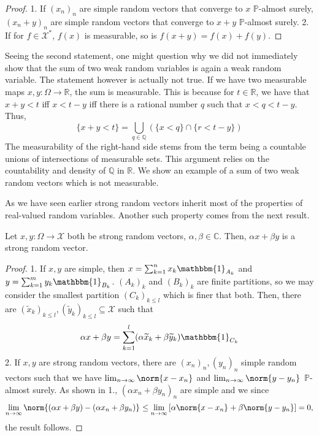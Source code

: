 \begin{proof}
    1. If \( (x_n)_n \) are simple random vectors that converge to \( x \) \( \mathbb{P} \)-almost surely, \( (x_n+y)_n \) are simple random vectors that converge to \( x+y \) \( \mathbb{P} \)-almost surely.
    2. If for \( f \in \mathcal{X}^{*} \), \( f(x) \) is measurable, so is \( f(x+y)=f(x)+f(y) \).
\end{proof}


Seeing the second statement, one might question why we did not immediately show that the sum of two weak random variables is again a weak random variable. The statement however is actually not true. If we have two measurable maps \( x,y: \Omega \to \mathbb{R} \), the sum is measurable. This is because for \( t \in \mathbb{R} \), we have that \( x+y < t \) iff \( x < t-y \) iff there is a rational number \( q \) such that \( x<q< t-y \). Thus,
\[ \{x+y< t\} = \bigcup_{q \in \mathbb{Q}} \left(\{x<q\} \cap \{r<t-y\}\right)\]
The measurability of the right-hand side stems from the term being a countable unions of intersections of measurable sets. This argument  relies on the countability and density of \( \mathbb{Q} \) in \( \mathbb{R} \). 
We show an example of a sum of two weak random vectors which is not measurable.

\begin{exm}
    
\end{exm}

As we have seen earlier strong random vectors inherit most of the properties of real-valued random variables. Another such property comes from the next result.
\begin{lem}
    Let \( x,y: \Omega \to \mathcal{X} \) both be strong random vectors, \( \alpha,\beta \in \mathbb{C} \). Then, \( \alpha x+ \beta y \) is a strong random vector.
\end{lem}

\begin{proof}
  1. If \( x,y \) are simple, then \( x= \sum_{k=1}^{n}x_k \mathbbm{1}_{A_k} \) and \( y=\sum_{k=1}^{m} y_k \mathbbm{1}_{B_k}  \). \( (A_k)_k \) and \( (B_k)_k \) are finite partitions, so we may consider the smallest partition \( (C_k)_{k\leq l} \) which is finer that both. Then, there are \( (\widetilde{x}_k)_{k\leq l}, (\widetilde{y}_k)_{k\leq l}  \subseteq \mathcal{X}\) such that 
  \[ \alpha x + \beta y= \sum_{k=1}^{l} (\alpha \widetilde{x}_k + \beta \widetilde{y}_k)\mathbbm{1}_{C_k} \]
  2. If \( x,y \) are strong random vectors, there are \( \left(x_n\right)_n, \left(y_n\right)_n \) simple random vectors such that we have \( \lim_{n \to \infty} \norm{x-x_n}_{} \) and \( \lim_{n \to \infty} \norm{y-y_n}_{} \) \( \mathbb{P} \)-almost surely. As shown in 1., \( (\alpha x_n + \beta y_n)_n \) are simple and we since 
  \[ \lim_{n \to \infty} \norm{(\alpha x+ \beta y)-(\alpha x_n + \beta y_n)}_{} \leq \lim_{n \to \infty} \left[ \alpha \norm{x-x_n}_{}+ \beta \norm{y-y_n}\right]=0,\]
  the result follows.
\end{proof}



